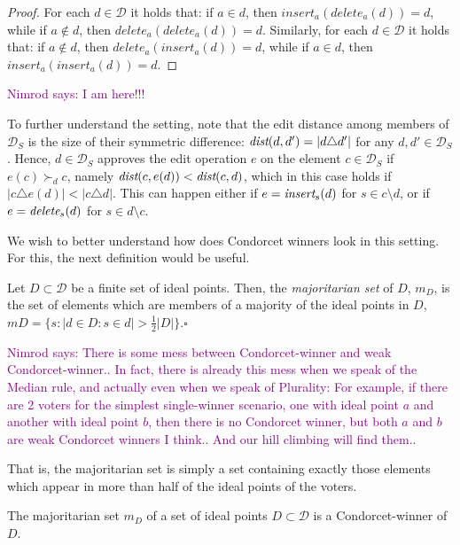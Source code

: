 \documentclass[sigconf]{aamas}  %
\newcommand{\nimrod}[1]{\textcolor{purple}{Nimrod says: #1}}
\newcommand{\qqed}{\hfill$\square$}
\newcommand{\calD}{\mathcal{D}}
\newcommand{\iinsert}[1]{\emph{insert}_{#1}}
\newcommand{\ddelete}[1]{\emph{delete}_{#1}}
\newcommand{\prefers}[1]{\succ_{#1}}
\newcommand{\dist}{\emph{dist}}
\begin{document}
\begin{proof}
%
For each $d \in \calD$ it holds that:
  if $a \in d$, then $insert_a(delete_a(d)) = d$,
  while if $a \notin d$, then $delete_a(delete_a(d)) = d$.
Similarly,
for each $d \in \calD$ it holds that:
  if $a \notin d$, then $delete_a(insert_a(d)) = d$,
  while if $a \in d$, then $insert_a(insert_a(d)) = d$.
%
\end{proof}


\nimrod{I am here!!!}


To further understand the setting, note that the edit distance among members of $\calD_S$ is the size of their symmetric difference:  $\dist(d,d') = |d \triangle d'|$ for any $d, d' \in \calD_S$. Hence,
$d \in \calD_S$ approves the edit operation $e$ on the element $c \in \calD_S$ if $e(c) \prefers{d} c$, namely  $\dist(c, e(d)) < \dist(c, d)$, which in this case holds if $|c \triangle e(d)| < |c \triangle d|$.  This can happen either if $e = \iinsert{s}(d)$ for $s  \in c \setminus d$, or if $e = \ddelete{s}(d)$ for $s  \in d \setminus c$. 

We wish to better understand how does Condorcet winners look in this setting. For this, the next definition would be useful.

\begin{definition}\label{definition:majoritatian-set}
%
Let $D \subset \calD$ be a finite set of ideal points. Then, the \emph{majoritarian set} of $D$, $m_D$, is the set of elements which are members of a majority of the ideal points in $D$, $mD = \{s: |d \in D : s \in d| > \frac{1}{2}{|D|}\}$.\qqed
%
\end{definition}

\nimrod{There is some mess between Condorcet-winner and weak Condorcet-winner.. In fact, there is already this mess when we speak of the Median rule, and actually even when we speak of Plurality:
  For example, if there are 2 voters for the simplest single-winner scenario, one with ideal point $a$ and another with ideal point $b$, then there is no Condorcet winner, but both $a$ and $b$ are weak Condorcet winners I think.. And our hill climbing will find them..}

That is, the majoritarian set is simply a set containing exactly those elements which appear in more than half of the ideal points of the voters.

\begin{lemma}
\label{lemma:condorcet-majoritarian}
The majoritarian set $m_D$ of a set of ideal points $D \subset \calD$ is a Condorcet-winner of $D$.
\end{lemma}
\end{document}
